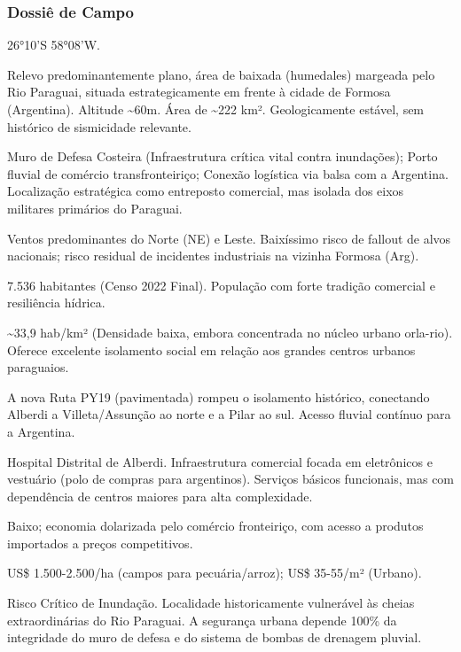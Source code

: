 \subsubsection{Dossiê de Campo}
\begin{description}[style=nextline,leftmargin=0.5cm,font=\bfseries]
\item[Coordenadas]  26°10'S 58°08'W.
\item[Topografia]  Relevo predominantemente plano, área de baixada (humedales) margeada pelo Rio Paraguai, situada estrategicamente em frente à cidade de Formosa (Argentina). Altitude \textasciitilde 60m. Área de \textasciitilde 222 km². Geologicamente estável, sem histórico de sismicidade relevante.
\item[Alvos Estratégicos]  Muro de Defesa Costeira (Infraestrutura crítica vital contra inundações); Porto fluvial de comércio transfronteiriço; Conexão logística via balsa com a Argentina. Localização estratégica como entreposto comercial, mas isolada dos eixos militares primários do Paraguai.
\item[Fallout]  Ventos predominantes do Norte (NE) e Leste. Baixíssimo risco de fallout de alvos nacionais; risco residual de incidentes industriais na vizinha Formosa (Arg).
\item[População]  7.536 habitantes (Censo 2022 Final). População com forte tradição comercial e resiliência hídrica.
\item[Densidade]  \textasciitilde 33,9 hab/\allowbreak km² (Densidade baixa, embora concentrada no núcleo urbano orla-rio). Oferece excelente isolamento social em relação aos grandes centros urbanos paraguaios.
\item[Vias de Acesso]  A nova Ruta PY19 (pavimentada) rompeu o isolamento histórico, conectando Alberdi a Villeta/\allowbreak Assunção ao norte e a Pilar ao sul. Acesso fluvial contínuo para a Argentina.
\item[Serviços]  Hospital Distrital de Alberdi. Infraestrutura comercial focada em eletrônicos e vestuário (polo de compras para argentinos). Serviços básicos funcionais, mas com dependência de centros maiores para alta complexidade.
\item[Custo de Vida]  Baixo; economia dolarizada pelo comércio fronteiriço, com acesso a produtos importados a preços competitivos.
\item[Preço da Terra]  US\$ 1.500-2.500/\allowbreak ha (campos para pecuária/\allowbreak arroz); US\$ 35-55/\allowbreak m² (Urbano).
\item[Hidrologia]  Risco Crítico de Inundação. Localidade historicamente vulnerável às cheias extraordinárias do Rio Paraguai. A segurança urbana depende 100\% da integridade do muro de defesa e do sistema de bombas de drenagem pluvial.

\end{description}
